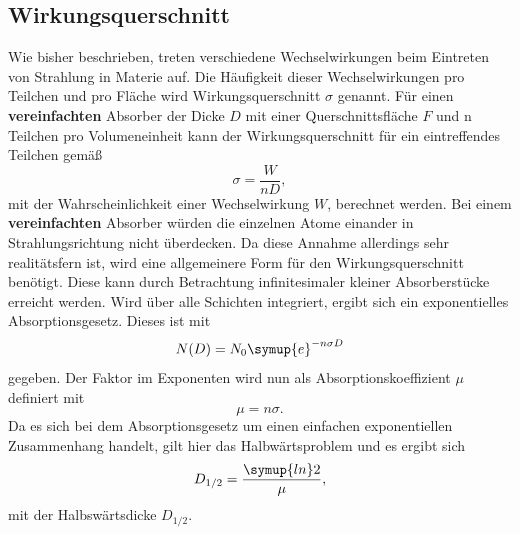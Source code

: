 \subsection{Wirkungsquerschnitt}
\label{subsec:Wirkungsquerschnitt}
Wie bisher beschrieben, treten verschiedene Wechselwirkungen beim Eintreten von Strahlung in Materie auf. Die Häufigkeit dieser Wechselwirkungen pro Teilchen und pro Fläche
wird Wirkungsquerschnitt $\sigma$ genannt. 
Für einen \textbf{vereinfachten} Absorber der Dicke $D$ mit einer Querschnittsfläche $F$ und n Teilchen pro Volumeneinheit kann der Wirkungsquerschnitt für ein eintreffendes
Teilchen gemäß 
\begin{equation*}
    \sigma = \frac{W}{nD},
\end{equation*}
mit der Wahrscheinlichkeit einer Wechselwirkung $W$, berechnet werden. Bei einem \textbf{vereinfachten} Absorber würden die einzelnen Atome einander in Strahlungsrichtung nicht
überdecken. Da diese Annahme allerdings sehr realitätsfern ist, wird eine allgemeinere Form für den Wirkungsquerschnitt benötigt. Diese kann durch Betrachtung infinitesimaler
kleiner Absorberstücke erreicht werden. Wird über alle Schichten integriert, ergibt sich ein exponentielles Absorptionsgesetz. Dieses ist mit 
\begin{equation}
    \label{eqn:eabsorbgesetz}
    N(D) = N_0 \symup{e}^{-n\sigma D}
\end{equation}
gegeben. Der Faktor im Exponenten wird nun als Absorptionskoeffizient $\mu$ definiert mit 
\begin{equation}
    \mu = n\sigma.
\end{equation}
Da es sich bei dem Absorptionsgesetz um einen einfachen exponentiellen Zusammenhang handelt, gilt hier das Halbwärtsproblem und es ergibt sich 
\begin{equation}
    \label{eqn:halbswärtsdicke}
    D_{1/2} = \frac{\symup{ln}2}{\mu},
\end{equation}
mit der Halbswärtsdicke $D_{1/2}$.

